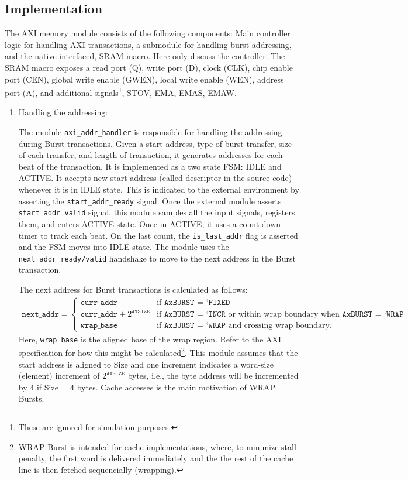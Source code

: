 \subsection{Implementation} 

The AXI memory module consists of the following components: Main controller logic for handling AXI transactions, a submodule for handling burst addressing, and the native interfaced, SRAM macro. Here only discuss the controller. The SRAM macro exposes a read port (Q), write port (D), clock (CLK), chip enable port (CEN), global write enable (GWEN), local write enable (WEN), address port (A), and additional signals\footnote{These are ignored for simulation purposes.}, STOV, EMA, EMAS, EMAW.

\begin{enumerate}
    \item Handling the addressing:
    
    The module \texttt{axi\_addr\_handler} is responsible for handling the addressing during Burst transactions. Given a start address, type of burst transfer, size of each transfer, and length of transaction, it generates addresses for each beat of the transaction. It is implemented as a two state FSM: IDLE and ACTIVE. It accepts new start address (called descriptor in the source code) whenever it is in IDLE state. This is indicated to the external environment by asserting the \texttt{start\_addr\_ready} signal. Once the external module asserts \texttt{start\_addr\_valid} signal, this module samples all the input signals, registers them, and enters ACTIVE state. Once in ACTIVE, it uses a count-down timer to track each beat. On the last count, the \texttt{is\_last\_addr} flag is asserted and the FSM moves into IDLE state. The module uses the \texttt{next\_addr\_ready/valid} handshake to move to the next address in the Burst transaction. 

    The next address for Burst transactions is calculated as follows:
    \begin{align}
        \texttt{next\_addr} = \begin{cases}
            \texttt{curr\_addr} & \text{if } \texttt{AxBURST = `FIXED}\\
            \texttt{curr\_addr} + 2^{\texttt{AxSIZE}} & \text{if } \texttt{AxBURST = `INCR} \text{ or within wrap boundary when } \texttt{AxBURST = `WRAP}  \\
            \texttt{wrap\_base} & \text{if } \texttt{AxBURST = `WRAP} \text{ and crossing wrap boundary.}
        \end{cases}
    \end{align}
    Here, \texttt{wrap\_base} is the aligned base of the wrap region. Refer to the AXI specification for how this might be calculated\footnote{WRAP Burst is intended for cache implementations, where, to minimize stall penalty, the first word is delivered immediately and the the rest of the cache line is then fetched sequencially (wrapping).}. This module assumes that the start address is aligned to Size and one increment indicates a word-size (element) increment of \(2^{\texttt{AxSIZE}}\) bytes, i.e., the byte address will be incremented by 4 if Size = 4 bytes. Cache accesses is the main motivation of WRAP Bursts.


\end{enumerate}
